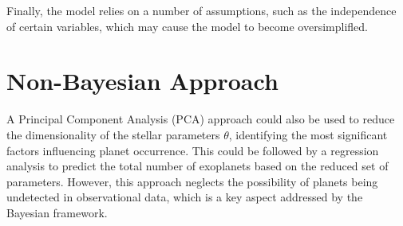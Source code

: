 \documentclass[preprint]{aastex631}
\begin{document}
Finally, the model relies on a number of assumptions, such as the independence of certain variables, which may cause the model to become oversimplifled.

\section{Non-Bayesian Approach}

A Principal Component Analysis (PCA) approach could also be used to reduce the dimensionality of the stellar parameters $\theta$, identifying the most significant factors influencing planet occurrence. This could be followed by a regression analysis to predict the total number of exoplanets based on the reduced set of parameters. However, this approach neglects the possibility of planets being undetected in observational data, which is a key aspect addressed by the Bayesian framework.


\end{document}

